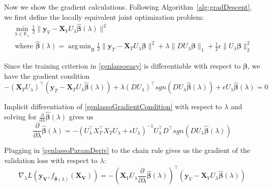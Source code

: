\documentclass[10pt,letterpaper]{article}
\DeclareMathOperator*{\argmin}{arg\,min}
\begin{document}
Now we show the gradient calculations. Following Algorithm~\ref{alg:gradDescent}, we first define the locally equivalent joint optimization problem:
\begin{equation}
\begin{array}{c}
\min_{\lambda \in \mathbb{R}_{+}} \frac{1}{2} \| \boldsymbol{y}_V - \boldsymbol{X}_V U_\lambda \hat{\boldsymbol{\beta}} (\lambda) \| ^2 \\
\text{ where }
\hat{\boldsymbol{\beta}} (\lambda) =
\argmin_{\boldsymbol{\beta}}
\frac{1}{2} \| \boldsymbol{y}_T - \boldsymbol{X}_T U_\lambda \boldsymbol{\beta} \| ^2
+ \lambda \| D U_\lambda \boldsymbol{\beta} \|_1
+ \frac{1}{2} \epsilon \| U_\lambda \boldsymbol{\beta} \|_2^2
\end{array}
\label{genlassoeasy}
\end{equation}

Since the training criterion in \eqref{genlassoeasy} is differentiable with respect to $\boldsymbol \beta$, we have the gradient condition
\begin{equation}
- (\boldsymbol{X}_T U_\lambda)^\top (\boldsymbol{y}_T - \boldsymbol{X}_T U_\lambda \hat {\boldsymbol\beta} (\lambda))
+ \lambda (D U_\lambda)^\top sgn(DU_\lambda \hat{\boldsymbol \beta}(\lambda))
+ \epsilon U_\lambda \hat {\boldsymbol \beta}(\lambda)
= 0
\label{genlassoGradientCondition}
\end{equation}

Implicit differentiation of \eqref{genlassoGradientCondition} with respect to $\lambda$ and solving for $\frac{\partial}{\partial \lambda} \hat{\boldsymbol \beta}(\lambda)$ gives us
\begin{equation}
\frac{\partial}{\partial \lambda} \hat{\boldsymbol \beta}(\lambda) =
-(U_\lambda^\top X_T^\top X_T U_\lambda  + \epsilon U_\lambda)^{-1}
U_\lambda^\top D^\top sgn(DU_\lambda \hat{\boldsymbol \beta}(\lambda))
\label{genlassoParamDeriv}
\end{equation}

Plugging in \eqref{genlassoParamDeriv} to the chain rule gives us the gradient of the validation loss with respect to $\lambda$:
\begin{equation}
\nabla_{\lambda} L(\boldsymbol{y_V}, f_{\hat{\boldsymbol{\theta}}(\lambda)}(\boldsymbol{X_V})) = 
- \left (
\boldsymbol{X}_V U_\lambda
\frac{\partial}{\partial \lambda} \hat{\boldsymbol \beta}(\lambda)
\right )^\top
\left (
\boldsymbol{y}_V - \boldsymbol{X}_V U_\lambda \hat{\boldsymbol{\beta}} (\lambda)
\right )
\end{equation}
\end{document}
